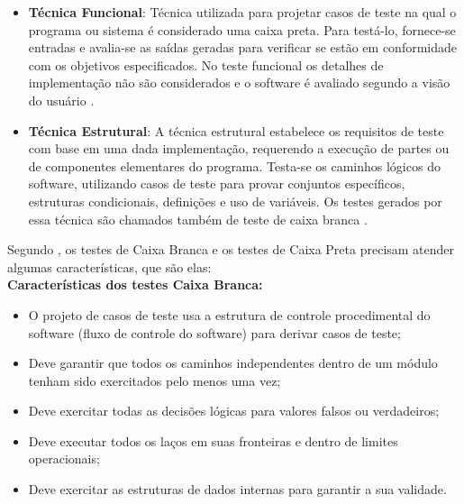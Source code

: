 \begin{itemize}
    \item \textbf{Técnica Funcional}: Técnica utilizada para projetar casos de teste na qual o programa ou sistema é considerado uma caixa preta. Para testá-lo, fornece-se entradas e avalia-se as saídas geradas para verificar se estão em conformidade com os objetivos especificados. No teste funcional os detalhes de implementação não são considerados e o software é avaliado segundo a visão do usuário \cite{DELAMARO2007}.
    
    
    
    
    \item \textbf{Técnica Estrutural}: A técnica estrutural estabelece os requisitos de teste com base em uma dada implementação, requerendo a execução de partes ou de componentes elementares do programa. Testa-se os caminhos lógicos do software, utilizando casos de teste para provar conjuntos específicos, estruturas condicionais, definições e uso de variáveis. Os testes gerados por essa técnica são chamados também de teste de caixa branca \cite{DELAMARO2007}.
    
    
\end{itemize}

Segundo , os testes de Caixa Branca e os testes de Caixa Preta precisam atender algumas características, que são elas:\\

\textbf{Características dos testes Caixa Branca:}

\begin{itemize}
    \item O projeto de casos de teste usa a estrutura de controle procedimental do software (fluxo de controle do software) para derivar casos de teste;
    \item Deve garantir que todos os caminhos independentes dentro de um módulo tenham sido exercitados pelo menos uma vez;
    \item Deve exercitar todas as decisões lógicas para valores falsos ou verdadeiros;
    \item Deve executar todos os laços em suas fronteiras e dentro de limites operacionais;
    \item Deve exercitar as estruturas de dados internas para garantir a sua validade.
\end{itemize}



